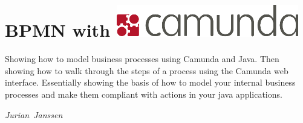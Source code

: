 
\section*{BPMN with \includegraphics[width=.5\linewidth]{images/camunda_logo.png}}
Showing how to model business processes using Camunda and Java. Then
showing how to walk through the steps of a process using the Camunda
web interface. Essentially showing the basis of how to model your
internal business processes and make them compliant with actions in
your java applications. 

\hfill\textit{Jurian~Janssen}